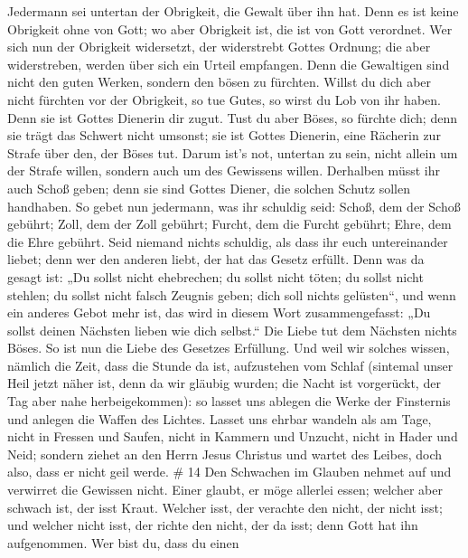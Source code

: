 Jedermann sei untertan der Obrigkeit, die Gewalt über ihn hat. Denn es
ist keine Obrigkeit ohne von Gott; wo aber Obrigkeit ist, die ist von
Gott verordnet.  Wer sich nun der Obrigkeit widersetzt, der
widerstrebt Gottes Ordnung; die aber widerstreben, werden über sich ein
Urteil empfangen.  Denn die Gewaltigen sind nicht den guten
Werken, sondern den bösen zu fürchten. Willst du dich aber nicht
fürchten vor der Obrigkeit, so tue Gutes, so wirst du Lob von ihr haben.
 Denn sie ist Gottes Dienerin dir zugut. Tust du aber Böses,
so fürchte dich; denn sie trägt das Schwert nicht umsonst; sie ist
Gottes Dienerin, eine Rächerin zur Strafe über den, der Böses tut.
 Darum ist's not, untertan zu sein, nicht allein um der
Strafe willen, sondern auch um des Gewissens willen. 
Derhalben müsst ihr auch Schoß geben; denn sie sind Gottes Diener, die
solchen Schutz sollen handhaben.  So gebet nun jedermann,
was ihr schuldig seid: Schoß, dem der Schoß gebührt; Zoll, dem der Zoll
gebührt; Furcht, dem die Furcht gebührt; Ehre, dem die Ehre gebührt.
 Seid niemand nichts schuldig, als dass ihr euch
untereinander liebet; denn wer den anderen liebt, der hat das Gesetz
erfüllt.  Denn was da gesagt ist: „Du sollst nicht
ehebrechen; du sollst nicht töten; du sollst nicht stehlen; du sollst
nicht falsch Zeugnis geben; dich soll nichts gelüsten``, und wenn ein
anderes Gebot mehr ist, das wird in diesem Wort zusammengefasst: „Du
sollst deinen Nächsten lieben wie dich selbst.``  Die Liebe
tut dem Nächsten nichts Böses. So ist nun die Liebe des Gesetzes
Erfüllung.  Und weil wir solches wissen, nämlich die Zeit,
dass die Stunde da ist, aufzustehen vom Schlaf (sintemal unser Heil
jetzt näher ist, denn da wir gläubig wurden;  die Nacht ist
vorgerückt, der Tag aber nahe herbeigekommen): so lasset uns ablegen die
Werke der Finsternis und anlegen die Waffen des Lichtes. 
Lasset uns ehrbar wandeln als am Tage, nicht in Fressen und Saufen,
nicht in Kammern und Unzucht, nicht in Hader und Neid; 
sondern ziehet an den Herrn Jesus Christus und wartet des Leibes, doch
also, dass er nicht geil werde. \# 14  Den Schwachen im
Glauben nehmet auf und verwirret die Gewissen nicht.  Einer
glaubt, er möge allerlei essen; welcher aber schwach ist, der isst
Kraut.  Welcher isst, der verachte den nicht, der nicht
isst; und welcher nicht isst, der richte den nicht, der da isst; denn
Gott hat ihn aufgenommen.  Wer bist du, dass du einen
